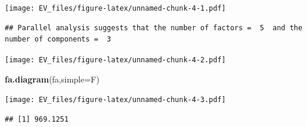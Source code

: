 \documentclass[]{article}
\newenvironment{Shaded}{\begin{snugshade}}{\end{snugshade}}
\newcommand{\KeywordTok}[1]{\textcolor[rgb]{0.13,0.29,0.53}{\textbf{#1}}}
\newcommand{\DataTypeTok}[1]{\textcolor[rgb]{0.13,0.29,0.53}{#1}}
\newcommand{\DecValTok}[1]{\textcolor[rgb]{0.00,0.00,0.81}{#1}}
\newcommand{\StringTok}[1]{\textcolor[rgb]{0.31,0.60,0.02}{#1}}
\newcommand{\CommentTok}[1]{\textcolor[rgb]{0.56,0.35,0.01}{\textit{#1}}}
\newcommand{\OperatorTok}[1]{\textcolor[rgb]{0.81,0.36,0.00}{\textbf{#1}}}
\newcommand{\NormalTok}[1]{#1}
\begin{document}
\texttt{[image: EV\_files/figure-latex/unnamed-chunk-4-1.pdf]}

\begin{verbatim}
## Parallel analysis suggests that the number of factors =  5  and the number of components =  3
\end{verbatim}

\begin{Shaded}
\end{Shaded}

\texttt{[image: EV\_files/figure-latex/unnamed-chunk-4-2.pdf]}

\begin{Shaded}
\begin{Highlighting}[]
\KeywordTok{fa.diagram}\NormalTok{(fa,}\DataTypeTok{simple=}\NormalTok{F)}
\end{Highlighting}
\end{Shaded}

\texttt{[image: EV\_files/figure-latex/unnamed-chunk-4-3.pdf]}

\begin{Shaded}
\end{Shaded}

\begin{verbatim}
## [1] 969.1251
\end{verbatim}
\end{document}
